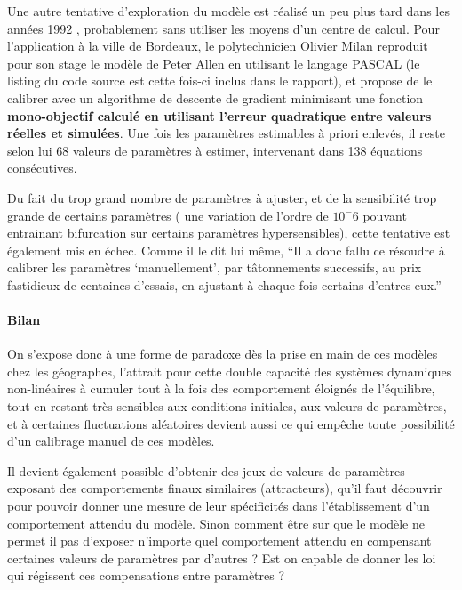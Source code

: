 Une autre tentative d'exploration du modèle est réalisé un peu plus tard dans les années 1992 \autocite{Milan1992}, probablement sans utiliser les moyens d'un centre de calcul. Pour l'application à la ville de Bordeaux, le polytechnicien Olivier Milan reproduit \autocite{Wilensky2007a} pour son stage le modèle de Peter Allen en utilisant le langage PASCAL (le listing du code source est cette fois-ci inclus dans le rapport), et propose de le calibrer avec un algorithme de descente de gradient minimisant une fonction \textbf{mono-objectif calculé en utilisant l'erreur quadratique entre valeurs réelles et simulées}. Une fois les paramètres estimables à priori enlevés, il reste selon lui 68 valeurs de paramètres à estimer, intervenant dans 138 équations consécutives.

Du fait du trop grand nombre de paramètres à ajuster, et de la sensibilité trop grande de certains paramètres ( une variation de l'ordre de $10^-6$ pouvant entrainant bifurcation sur certains paramètres hypersensibles), cette tentative est également mis en échec.  Comme il le dit lui même, \enquote{Il a donc fallu ce résoudre à calibrer les paramètres \enquote{manuellement}, par tâtonnements successifs, au prix fastidieux de centaines d'essais, en ajustant à chaque fois certains d'entres eux.}  %

\paragraph{Bilan}

On s'expose donc à une forme de paradoxe dès la prise en main de ces modèles chez les géographes, l'attrait pour cette double capacité des systèmes dynamiques non-linéaires à cumuler tout à la fois des comportement éloignés de l'équilibre, tout en restant très sensibles aux conditions initiales, aux valeurs de paramètres, et à certaines fluctuations aléatoires devient aussi ce qui empêche toute possibilité d'un calibrage manuel de ces modèles.

Il devient également possible d'obtenir des jeux de valeurs de paramètres exposant des comportements finaux similaires (attracteurs), qu'il faut découvrir pour pouvoir donner une mesure de leur spécificités dans l'établissement d'un comportement attendu du modèle. Sinon comment être sur que le modèle ne permet il pas d'exposer n'importe quel comportement attendu en compensant certaines valeurs de paramètres par d'autres ? Est on capable de donner les loi qui régissent ces compensations entre paramètres ?

